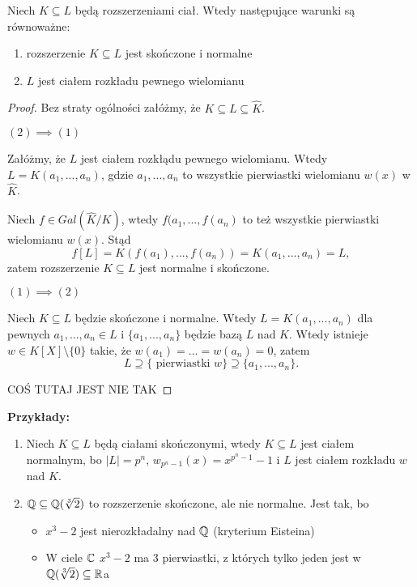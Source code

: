 \begin{theorem}
    Niech $K\subseteq L$ będą rozszerzeniami ciał. Wtedy następujące warunki są równoważne:
    \begin{enumerate}
        \item rozszerzenie $K\subseteq L$ jest skończone i normalne
        \item $L$ jest ciałem rozkładu pewnego wielomianu
    \end{enumerate}
\end{theorem}
\begin{proof} Bez straty ogólności załóżmy, że $K\subseteq L\subseteq\hat{K}$.

$(2)\implies(1)$

Załóżmy, że $L$ jest ciałem rozkłądu pewnego wielomianu. Wtedy $L=K(a_1,...,a_n)$, gdzie $a_1,...,a_n$ to wszystkie pierwiastki wielomianu $w(x)$ w $\hat{K}$.

Niech $f\in Gal(\hat{K}/K)$, wtedy $f(a_1,...,f(a_n)$ to też wszystkie pierwiastki wielomianu $w(x)$. Stąd 
$$f[L]=K(f(a_1),...,f(a_n))=K(a_1,...,a_n)=L,$$
zatem rozszerzenie $K\subseteq L$ jest normalne i skończone.

$(1)\implies(2)$

Niech $K\subseteq L$ będzie skończone i normalne. Wtedy $L=K(a_1,...,a_n)$ dla pewnych $a_1,...,a_n\in L$ i $\{a_1,...,a_n\}$ będzie bazą $L$ nad $K$. Wtedy istnieje $w\in K[X]\setminus\{0\}$ takie, że $w(a_1)=...=w(a_n)=0$, zatem 
$$L\supseteq\{\text{ pierwiastki }w\}\supseteq\{a_1,...,a_n\}.$$

{\large\color{orange}COŚ TUTAJ JEST NIE TAK}
\end{proof}

\textbf{Przykłady:} 
\begin{enumerate}
    \item Niech $K\subseteq L$ będą ciałami skończonymi, wtedy $K\subseteq L$ jest ciałem normalnym, bo $|L|=p^n$, $w_{p^n-1}(x)=x^{p^n-1}-1$ i $L$ jest ciałem rozkładu $w$ nad $K$.
    \item $\mathbb{Q}\subseteq\mathbb{Q}(\sqrt[3]{2})$ to rozszerzenie skończone, ale nie normalne. Jest tak, bo
        \begin{itemize}
            \item $x^3-2$ jest nierozkładalny nad $\mathbb{Q}$ (kryterium Eisteina)
            \item W ciele $\mathbb{C}$ $x^3-2$ ma $3$ pierwiastki, z których tylko jeden jest w $\mathbb{Q}(\sqrt[3]{2})\subseteq\mathbb{R}$a
        \end{itemize}
\end{enumerate}

